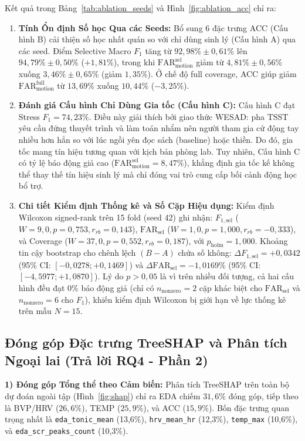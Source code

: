 \documentclass[conference]{IEEEtran}
\begin{document}
Kết quả trong Bảng~\ref{tab:ablation_seeds} và Hình~\ref{fig:ablation_acc} chỉ ra:
\begin{enumerate}
    \item \textbf{Tính Ổn định Số học Qua các Seeds:} Bổ sung 6 đặc trưng ACC (Cấu hình B) cải thiện số học nhất quán so với chỉ dùng sinh lý (Cấu hình A) qua các seed. Điểm Selective Macro $F_1$ tăng từ $92,98\% \pm 0,61\%$ lên $94,79\% \pm 0,50\%$ ($+1,81\%$), trong khi $\text{FAR}_{\text{motion}}^{\text{sel}}$ giảm từ $4,81\% \pm 0,56\%$ xuống $3,46\% \pm 0,65\%$ (giảm $1,35\%$). Ở chế độ full coverage, ACC giúp giảm $\text{FAR}_{\text{motion}}^{\text{full}}$ từ $13,69\%$ xuống $10,44\%$ ($-3,25\%$).
    \item \textbf{Đánh giá Cấu hình Chỉ Dùng Gia tốc (Cấu hình C):} Cấu hình C đạt Stress $F_1 = 74,23\%$. Điều này giải thích bởi giao thức WESAD: pha TSST yêu cầu đứng thuyết trình và làm toán nhẩm nên người tham gia cử động tay nhiều hơn hẳn so với lúc ngồi yên đọc sách (baseline) hoặc thiền. Do đó, gia tốc mang tín hiệu tương quan với kịch bản phòng lab. Tuy nhiên, Cấu hình C có tỷ lệ báo động giả cao ($\text{FAR}_{\text{motion}}^{\text{sel}} = 8,47\%$), khẳng định gia tốc kế không thể thay thế tín hiệu sinh lý mà chỉ đóng vai trò cung cấp bối cảnh động học bổ trợ.
    \item \textbf{Chi tiết Kiểm định Thống kê và Số Cặp Hiệu dụng:} Kiểm định Wilcoxon signed-rank trên 15 fold (seed 42) ghi nhận: $F_{1,\text{sel}}$ ($W = 9,0, p = 0,753, r_{rb} = 0,143$), $\text{FAR}_{\text{sel}}$ ($W = 1,0, p = 1,000, r_{rb} = -0,333$), và Coverage ($W = 37,0, p = 0,552, r_{rb} = 0,187$), với $p_{\text{holm}} = 1,000$. Khoảng tin cậy bootstrap cho chênh lệch $(B - A)$ chứa số không: $\Delta F_{1,\text{sel}} = +0,0342$ (95\% CI: $[-0,0278; +0,1469]$) và $\Delta \text{FAR}_{\text{sel}} = -1,0169\%$ (95\% CI: $[-4,5977; +1,0870]$). Lý do $p > 0,05$ là vì trên nhiều đối tượng, cả hai cấu hình đều đạt $0\%$ báo động giả (chỉ có $n_{\text{nonzero}} = 2$ cặp khác biệt cho $\text{FAR}_{\text{sel}}$ và $n_{\text{nonzero}} = 6$ cho $F_1$), khiến kiểm định Wilcoxon bị giới hạn về lực thống kê trên mẫu $N=15$.
\end{enumerate}

\subsection{Đóng góp Đặc trưng TreeSHAP và Phân tích Ngoại lai (Trả lời RQ4 - Phần 2)}

\textbf{1) Đóng góp Tổng thể theo Cảm biến:} Phân tích TreeSHAP \cite{lundberg2020local} trên toàn bộ dự đoán ngoài tập (Hình~\ref{fig:shap}) chỉ ra EDA chiếm $31,6\%$ đóng góp, tiếp theo là BVP/HRV ($26,6\%$), TEMP ($25,9\%$), và ACC ($15,9\%$). Bốn đặc trưng quan trọng nhất là \texttt{eda\_tonic\_mean} (13,6\%), \texttt{hrv\_mean\_hr} (12,3\%), \texttt{temp\_max} (10,6\%), và \texttt{eda\_scr\_peaks\_count} (10,3\%).
\end{document}

